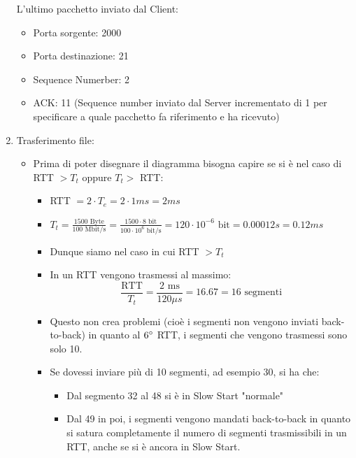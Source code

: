 \documentclass[10pt,a4paper]{article}
\begin{document}
\begin{enumerate}
\begin{itemize}
		\end{itemize}
		L'ultimo pacchetto inviato dal Client:
		\begin{itemize}
			\item Porta sorgente: 2000 
			\item Porta destinazione: 21 
			\item Sequence Numerber: 2
			\item ACK: 11 (Sequence number inviato dal Server incrementato di 1 per specificare a quale pacchetto fa riferimento e ha ricevuto)
		\end{itemize}
		\newpage
		\item Trasferimento file:
		\begin{itemize}
			\item Prima di poter disegnare il diagramma bisogna capire se si è nel caso di RTT $> T_t$ oppure $T_t > $ RTT:
			\begin{itemize}
				\item RTT $= 2 \cdot T_e = 2 \cdot 1 ms = 2ms$
				\item $T_t = \displaystyle{ \frac{1500 \textrm{ Byte}}{100 \textrm{ Mbit/s}}} =\displaystyle{ \frac{1500 \cdot 8 \textrm{ bit}}{100 \cdot 10^6 \textrm{ bit/s}}} = 120 \cdot 10^{-6} \textrm{ bit} = 0.00012 s = 0.12 ms$ 
				\item Dunque siamo nel caso in cui RTT $> T_t$
				\item In un RTT vengono trasmessi al massimo: $$\frac{\textrm{RTT}}{T_t} = \frac{2 \textrm{ ms}}{120 \mu s} = 16.67 = 16 \textrm{ segmenti} $$
				\item Questo non crea problemi (cioè i segmenti non vengono inviati back-to-back) in quanto al $6 \degree$ RTT, i segmenti che vengono trasmessi sono solo 10.
				\item Se dovessi inviare più di 10 segmenti, ad esempio 30, si ha che:
					\begin{itemize}
						\item Dal segmento 32 al 48 si è in Slow Start "normale"
						\item Dal 49 in poi, i segmenti vengono mandati back-to-back in quanto si satura completamente il numero di segmenti trasmissibili in un RTT, anche se si è ancora in Slow Start.
					\end{itemize}
			\end{itemize}
		\end{itemize}
		\begin{center}
			\centering
			 \begin{tabular}{@{} *{3}{c} @{}}

\end{tabular}
\end{center}
\end{enumerate}
\end{document}
